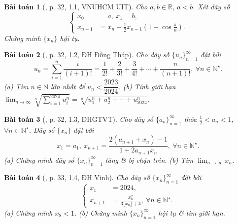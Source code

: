 \documentclass{article}
\newtheorem{baitoan}{Bài toán}
\begin{document}
\begin{baitoan}[\cite{VMS_VMC2024}, p. 32, 1.1, VNUHCM UIT]
	Cho $a,b\in\mathbb{R}$, $a < b$. Xét dãy số
	\begin{equation*}
		\left\{\begin{split}
			x_0 &= a,\ x_1 = b,\\
			x_{n+1} &= x_n + \frac{1}{2}x_{n-1}\left(1 - \cos\frac{\pi}{n}\right).
		\end{split}\right.
	\end{equation*}
	Chứng minh $\{x_n\}$ hội tụ.
\end{baitoan}

\begin{baitoan}[\cite{VMS_VMC2024}, p. 32, 1.2, ĐH Đồng Tháp]
	Cho dãy số $\{u_n\}_{n=1}^\infty$ đặt bởi
	\begin{equation*}
		u_n = \sum_{i=1}^n \frac{i}{(i + 1)!} = \frac{1}{2!} + \frac{2}{3!} + \frac{3}{4!} + \cdots + \frac{n}{(n + 1)!},\ \forall n\in\mathbb{N}^\star.
	\end{equation*}
	(a) Tìm $n\in\mathbb{N}$ lớn nhất để $u_n < \dfrac{2023}{2024}$. (b) Tính giới hạn $\lim_{n\to\infty} \sqrt[n]{\sum_{i=1}^{2024} u_i^n} = \sqrt[n]{u_1^n + u_2^n + \cdots + u_{2024}^n}$.
\end{baitoan}

\begin{baitoan}[\cite{VMS_VMC2024}, p. 32, 1.3, ĐHGTVT]
	Cho dãy số $\{a_n\}_{n=1}^\infty$ thỏa $\frac{1}{2} < a_n < 1$, $\forall n\in\mathbb{N}^\star$. Dãy số $\{x_n\}$ đặt bởi
	\begin{equation*}
		x_1 = a_1,\ x_{n+1} = \frac{2(a_{n+1} + x_n) - 1}{1 + 2a_{n+1}x_n},\ \forall n\in\mathbb{N}^\star.
	\end{equation*}
	(a) Chứng minh dãy số $\{x_n\}_{n=1}^\infty$ tăng \& bị chặn trên. (b) Tìm $\lim_{n\to\infty} x_n$.
\end{baitoan}

\begin{baitoan}[\cite{VMS_VMC2024}, p. 33, 1.4, ĐH Vinh]
	Cho dãy số $\{x_n\}_{n=1}^\infty$ đặt bởi
	\begin{equation*}
		\left\{\begin{split}
			x_1 &= 2024,\\
			x_{n+1} &= \frac{x_n^2}{3\lfloor x_n\rfloor + 4},\ \forall n\in\mathbb{N}^\star.
		\end{split}\right.
	\end{equation*}
	(a) Chứng minh $x_8 < 1$. (b) Chứng minh $\{x_n\}_{n=1}^\infty$ hội tụ \& tìm giới hạn.
\end{baitoan}
\end{document}
